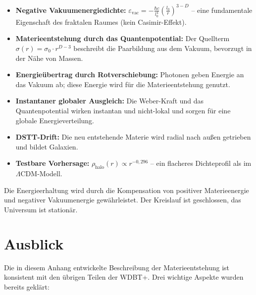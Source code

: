 \begin{itemize}
    \item \textbf{Negative Vakuumenergiedichte:} \( \varepsilon_{\text{vac}} = -\frac{\hbar c}{l_0^4} \left( \frac{l_0}{r} \right)^{3-D} \)
          – eine fundamentale Eigenschaft des fraktalen Raumes (kein Casimir-Effekt).
    
    \item \textbf{Materieentstehung durch das Quantenpotential:} Der Quellterm
          \( \sigma(r) = \sigma_0 \cdot r^{D-3} \) beschreibt die Paarbildung aus dem Vakuum,
          bevorzugt in der Nähe von Massen.
    
    \item \textbf{Energieübertrag durch Rotverschiebung:} Photonen geben Energie an das
          Vakuum ab; diese Energie wird für die Materieentstehung genutzt.
    
    \item \textbf{Instantaner globaler Ausgleich:} Die Weber-Kraft und das Quantenpotential
          wirken instantan und nicht-lokal und sorgen für eine globale Energieverteilung.
    
    \item \textbf{DSTT-Drift:} Die neu entstehende Materie wird radial nach außen getrieben
          und bildet Galaxien.
    
    \item \textbf{Testbare Vorhersage:} \( \rho_{\text{halo}}(r) \propto r^{-0,296} \)
          – ein flacheres Dichteprofil als im \(\Lambda\)CDM-Modell.
\end{itemize}

Die Energieerhaltung wird durch die Kompensation von positiver Materieenergie und
negativer Vakuumenergie gewährleistet. Der Kreislauf ist geschlossen, das Universum
ist stationär.

\section{Ausblick}
\label{app:materieentstehung_ausblick}

Die in diesem Anhang entwickelte Beschreibung der Materieentstehung ist konsistent
mit den übrigen Teilen der WDBT+. Drei wichtige Aspekte wurden bereits geklärt:

